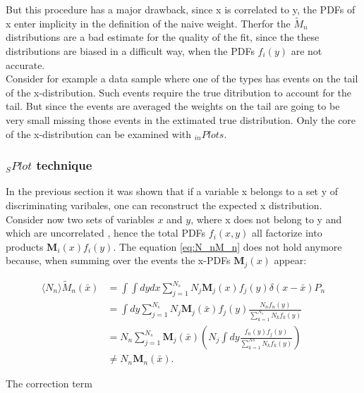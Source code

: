 \documentclass[english]{uzhpub}
\begin{document}
But this procedure has a major drawback, since x is correlated to y, the PDFs of x enter implicity in the definition of the naive weight. Therfor the $\tilde{M}_n$ distributions are a bad estimate for the quality of the fit, since the these distributions are biased in a difficult way, when the PDFs $f_i(y)$ are not accurate. \\
Consider for example a data sample where one of the types has events on the tail of the x-distribution. Such events require the true ditribution to account for the tail. But since the events are averaged the weights on the tail are going to be very small missing those events in the extimated true distribution. Only the core of the x-distribution can be examined with $_{in} Plots$.


\subsubsection{$_{S} Plot$ technique}
In the previous section it was shown that if a variable x belongs to a set y of discriminating varibales, one can reconstruct the expected x distribution.
Consider now two sets of variables $x$ and $y$, where x does not belong to y and which are uncorrelated , hence the total PDFs $f_i (x,y)$ all factorize into products $\textbf{M}_i (x) f_i(y)$.
The equation \ref{eq:N_nM_n} does not hold anymore because, when summing over the events the x-PDFs $\textbf{M}_j(x)$ appear:

\begin{align}
 \langle N_n \rangle \tilde{M}_n (\bar{x}) & = \int \int dy dx \sum_{j=1}^{N_s} N_j \textbf{M}_j (x) f_j (y) \delta (x- \bar{x}) P_n \label{eq:M_nX}                    \\
                                           & = \int dy \sum_{j=1}^{N_s} N_j \textbf{M}_j (\bar{x}) f_j(y) \frac{N_n f_n(y)}{\sum_{k=1}^{N_s} N_k f_k(y)}                \\
                                           & = N_n \sum_{j=1}^{N_s} \textbf{M}_j (\bar{x}) \left( N_j \int dy \frac{f_n(y) f_j(y)}{\sum_{k=1}^{Ns} N_k f_k (y)} \right) \\
                                           & \neq N_n \textbf{M}_n (\bar{x}).
\end{align}

The correction term
\end{document}
